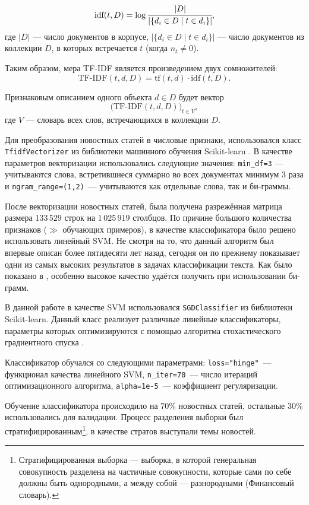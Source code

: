 \documentclass[a4paper, 14pt]{extarticle}
\begin{document}
$$
\text{idf}(t, D) = \log{ \cfrac{|D|}{|\{ d_i \in D \mid t \in d_i \}|}},
$$
где $|D|$ --- число документов в корпусе, $|\{ d_i \in D \mid t \in d_i \}|$ — число документов из коллекции $D$, в которых встречается 
$t$ (когда $n_{t} \neq 0$).

Таким образом, мера TF-IDF является произведением двух сомножителей:
$$
\text{TF-IDF}(t, d, D) = \text{tf}(t, d) \cdot \text{idf}(t, D).
$$

Признаковым описанием одного объекта $d \in D$ будет вектор
$$
\big(\text{TF-IDF}(t,d,D)\big)_{t\in V},
$$
где $V$ --- словарь всех слов, встречающихся в коллекции $D$.

Для преобразования новостных статей в числовые признаки, использовался класс \verb+TfidfVectorizer+ из библиотеки машинного обучения Scikit-learn 
\cite{scikit-learn}. В качестве параметров векторизации использовались следующие значения: \verb+min_df=3+ --- учитываются слова, встретившиеся 
суммарно во всех документах минимум 3 раза и  \verb+ngram_range=(1,2)+~--- учитываются как отдельные слова, так и би-граммы.

После векторизации новостных статей, была получена разрежённая матрица размера $133\,529$ строк на $1\,025\,919$ столбцов. По причине большого 
количества признаков ($\gg$  обучающих примеров), в качестве классификатора было решено использовать линейный SVM. Не смотря на то, что данный 
алгоритм был впервые описан более пятидесяти лет назад, сегодня он по прежнему показывает одни из самых высоких результатов в задачах классификации 
текста. Как было показано в \cite{wang12simple}, особенно высокое качество удаётся получить при использовании би-грамм.

В данной работе в качестве SVM использовался \verb+SGDClassifier+ из библиотеки Scikit-learn. Данный класс реализует различные линейные
классификаторы, параметры которых оптимизируются с помощью алгоритма стохастического градиентного спуска \cite{Bottou2010}.

Классификатор обучался со следующими параметрами: \verb+loss="hinge"+~--- функционал качества линейного SVM,
\verb+n_iter=70+~--- число итераций оптимизационного алгоритма, \verb+alpha=1e-5+~--- коэффициент регуляризации.

Обучение классификатора происходило на $70\%$ новостных статей, остальные $30\%$ использовались для валидации.
Процесс разделения выборки был стратифицированным\footnote{Стратифицированная выборка --- выборка, в которой генеральная совокупность разделена на 
частичные совокупности, которые сами по себе должны быть однородными, а между собой --- разнородными (Финансовый словарь).}, в качестве
стратов выступали темы новостей.
\end{document}
